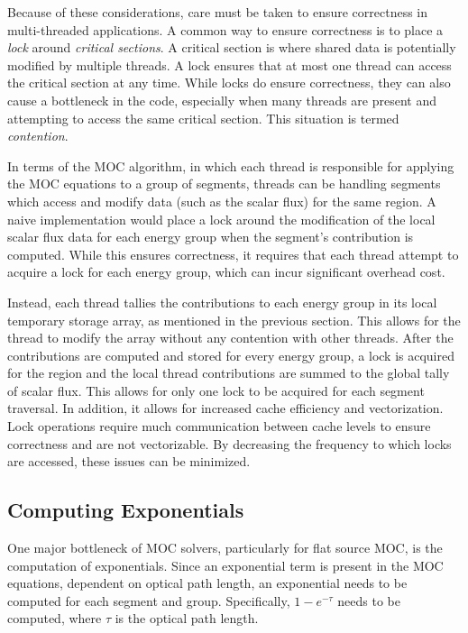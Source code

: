 Because of these considerations, care must be taken to ensure correctness in multi-threaded applications. A common way to ensure correctness is to place a \textit{lock} around \textit{critical sections}. A critical section is where shared data is potentially modified by multiple threads. A lock ensures that at most one thread can access the critical section at any time. While locks do ensure correctness, they can also cause a bottleneck in the code, especially when many threads are present and attempting to access the same critical section. This situation is termed \textit{contention}.

In terms of the \ac{MOC} algorithm, in which each thread is responsible for applying the \ac{MOC} equations to a group of segments, threads can be handling segments which access and modify data (such as the scalar flux) for the same region. A naive implementation would place a lock around the modification of the local scalar flux data for each energy group when the segment's contribution is computed. While this ensures correctness, it requires that each thread attempt to acquire a lock for each energy group, which can incur significant overhead cost.

Instead, each thread tallies the contributions to each energy group in its local temporary storage array, as mentioned in the previous section. This allows for the thread to modify the array without any contention with other threads. After the contributions are computed and stored for every energy group, a lock is acquired for the region and the local thread contributions are summed to the global tally of scalar flux. This allows for only one lock to be acquired for each segment traversal. In addition, it allows for increased cache efficiency and vectorization. Lock operations require much communication between cache levels to ensure correctness and are not vectorizable. By decreasing the frequency to which locks are accessed, these issues can be minimized.

\subsection{Computing Exponentials}

One major bottleneck of \ac{MOC} solvers, particularly for flat source \ac{MOC}, is the computation of exponentials. Since an exponential term is present in the \ac{MOC} equations, dependent on optical path length, an exponential needs to be computed for each segment and group. Specifically, $1-e^{-\tau}$ needs to be computed, where $\tau$ is the optical path length. 


